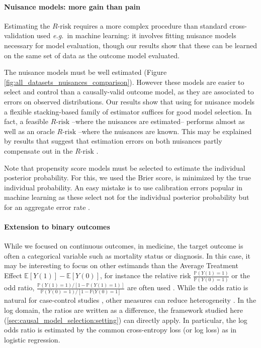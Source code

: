 \documentclass{report}
\begin{document}
\paragraph{Nuisance models: more gain than pain}
%
Estimating the $R\text{-risk}$ requires a more complex procedure than
standard cross-validation used \emph{e.g.}~in machine learning: it involves
fitting nuisance models necessary for model evaluation, though our
results show that these can be learned on the same set of data
as the outcome model evaluated.

The nuisance models must be well estimated (Figure
\ref{fig:all_datasets_nuisances_comparison}). However these models are
easier to select and control than a causally-valid outcome model,
as they are associated to errors on
observed distributions. Our results show that using for nuisance models
a flexible stacking-based family of estimator suffices for good model selection.
%
In fact, a feasible $R\text{-risk}$ --where the nuisances
are estimated-- performs almost as well as an oracle $R\text{-risk}$ --where the
nuisances are known. This may be explained by
results that suggest that estimation errors on both
nuisances partly compensate out in the
$R\text{-risk}$ \citep{daniel2018double,kennedy2020optimal,nie_quasioracle_2017,chernozhukov_double_2018,zivich2021machine,naimi2021challenges}.

Note that propensity score models must be selected to estimate
the individual posterior probability. For this, we used the Brier score,
is minimized by the true individual probability. An easy mistake is to
use calibration errors popular in machine learning
\citep{platt_probabilistic_1999,zadrozny_obtaining_2001,niculescu-mizil_predicting_2005,minderer_revisiting_2021}
as these select not for the individual posterior probability but for an
aggregate error rate \citep{perez2022beyond}.


\paragraph{Extension to binary outcomes}
While we focused on continuous outcomes, in medicine, the target outcome is
often a categorical variable such as mortality status or diagnosis. In this
case, it may be interesting to focus on other estimands than the Average
Treatment Effect $\mathbb{E}[Y(1)] -\mathbb{E}[Y(0)] $, for instance the
relative risk $\frac{\mathbb P(Y(1) = 1)}{\mathbb P(Y(0) = 1)}$ or the odd
ratio, $\frac{\mathbb P(Y(1) = 1) / [1 - \mathbb P(Y(1) =1)]}{\mathbb P(Y(0) =
  1) / [1 - \mathbb P(Y(0) = 1]}$ are often used \citep{austin2017estimating}.
While the odds ratio is natural for case-control studies \citep{rothman2008case},
other measures can reduce heterogeneity \citep{colnet2023risk}. In the log
domain, the ratios are written as a difference, the framework studied here
(\autoref{sec:causal_model_selection:setting}) can directly apply. In
particular, the log odds ratio is estimated by the common cross-entropy loss (or
log loss) as in logistic regression.
\end{document}

